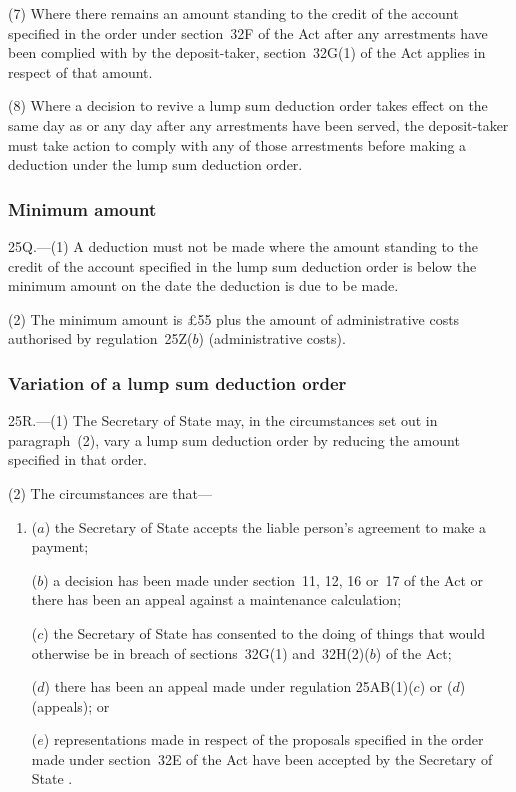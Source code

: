 \documentclass[12pt,a4paper]{article}
\begin{document}
(7) Where there remains an amount standing to the credit of the account specified in the order under section~32F of the Act after any arrestments have been complied with by the deposit-taker, section~32G(1) of the Act applies in respect of that amount.

(8) Where a decision to revive a lump sum deduction order takes effect on the same day as or any day after any arrestments have been served, the deposit-taker must take action to comply with any of those arrestments before making a deduction under the lump sum deduction order.

\subsubsection[25Q. Minimum amount]{Minimum amount}

25Q.---(1)  A deduction must not be made where the amount standing to the credit of the account specified in the lump sum deduction order is below the minimum amount on the date the deduction is due to be made.

(2) The minimum amount is £55 plus the amount of administrative costs authorised by regulation~25Z($b$)  (administrative costs).

\subsubsection[25R. Variation of a lump sum deduction order]{Variation of a lump sum deduction order}

25R.---(1)  The 
Secretary of State  %
may, in the circumstances set out in paragraph~(2), vary a lump sum deduction order by reducing the amount specified in that order.

(2) The circumstances are that—
\begin{enumerate}\item[]
($a$) the 
Secretary of State  %
accepts the liable person’s agreement to make a payment;

($b$) a decision has been made under section~11, 12, 16 or~17 of the Act or there has been an appeal against a maintenance calculation;

\begin{sloppypar}
($c$) the 
Secretary of State  %
has consented to the doing of things that would otherwise be in breach of sections~32G(1) and~32H(2)($b$)  of the Act;
\end{sloppypar}

\begin{sloppypar}
($d$) there has been an appeal made under regulation 25AB(1)($c$)  or ($d$)  (appeals); or
\end{sloppypar}

($e$) representations made in respect of the proposals specified in the order made under section~32E of the Act have been accepted by the 
Secretary of State%
.
\end{enumerate}
\end{document}

